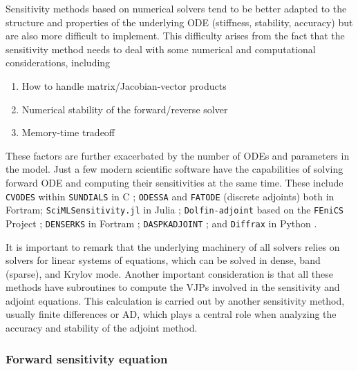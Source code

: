 
Sensitivity methods based on numerical solvers tend to be better adapted to the structure and properties of the underlying ODE (stiffness, stability, accuracy) but are also more difficult to implement.  
This difficulty arises from the fact that the sensitivity method needs to deal with some numerical and computational considerations, including
\begin{enumerate}[label=(\roman*)]
    \item How to handle matrix/Jacobian-vector products
    \item Numerical stability of the forward/reverse solver
    \item Memory-time tradeoff
\end{enumerate}
These factors are further exacerbated by the number of ODEs and parameters in the model. 
Just a few modern scientific software have the capabilities of solving forward ODE and computing their sensitivities at the same time. 
These include 
\texttt{CVODES} within \texttt{SUNDIALS} in C \cite{serban2005cvodes, SUNDIALS-hindmarsh2005sundials}; 
\texttt{ODESSA} \cite{ODESSA} and \texttt{FATODE} (discrete adjoints) \cite{FATODE2014} both in Fortram; 
\texttt{SciMLSensitivity.jl} in Julia \cite{rackauckas2020universal}; 
\texttt{Dolfin-adjoint} based on the \texttt{FEniCS} Project \cite{dolfin2013, dolfin2018};
\texttt{DENSERKS} in Fortram \cite{alexe2007denserks}; 
\texttt{DASPKADJOINT} \cite{Cao_Li_Petzold_2002};
and \texttt{Diffrax} in Python \cite{kidger2021on}. 

It is important to remark that the underlying machinery of all solvers relies on solvers for linear systems of equations, which can be solved in dense, band (sparse), and Krylov mode. 
Another important consideration is that all these methods have subroutines to compute the VJPs involved in the sensitivity and adjoint equations. 
This calculation is carried out by another sensitivity method, usually finite differences or AD, which plays a central role when analyzing the accuracy and stability of the adjoint method. 

\subsubsection{Forward sensitivity equation}
\label{section:computing-sensitivity-equations}


